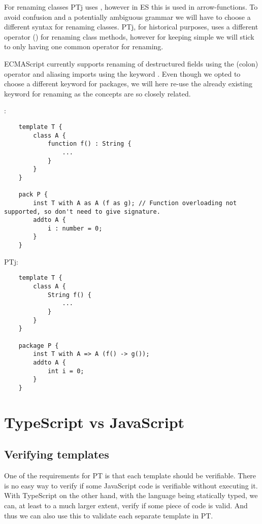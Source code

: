 For renaming classes PTj uses \codeword{=>}, however in ES this is used in arrow-functions\cite{arrowfunction}.
To avoid confusion and a potentially ambiguous grammar we will have to choose a different syntax for renaming classes.
PTj, for historical purposes, uses a different operator (\codeword{->}) for renaming class methods, however for keeping \plname{} simple we will stick to only having one common operator for renaming.

ECMAScript currently supports renaming of destructured fields using the \codeword{:}(colon) operator and aliasing imports using the keyword .
Even though we opted to choose a different keyword for packages, we will here re-use the already existing  keyword for renaming as the concepts are so closely related.

\plname{}:
\begin{lstlisting}
    template T {
        class A {
            function f() : String {
                ...
            }
        }
    }

    pack P {
        inst T with A as A (f as g); // Function overloading not supported, so don't need to give signature.
        addto A {
            i : number = 0;
        }
    }
\end{lstlisting}

PTj:
\begin{lstlisting}
    template T {
        class A {
            String f() {
                ...
            }
        }
    }

    package P {
        inst T with A => A (f() -> g()); 
        addto A {
            int i = 0;
        }
    }
\end{lstlisting}



\section{TypeScript vs JavaScript}\label{sec:typescript-vs-javascript}

\subsection{Verifying templates}\label{subsec:why-typescript-verifying-templates}

One of the requirements for PT is that each template should be verifiable.
There is no easy way to verify if some JavaScript code is verifiable without executing it.
With TypeScript on the other hand, with the language being statically typed, we can, at least to a much larger extent, verify if some piece of code is valid.
And thus we can also use this to validate each separate template in PT.

